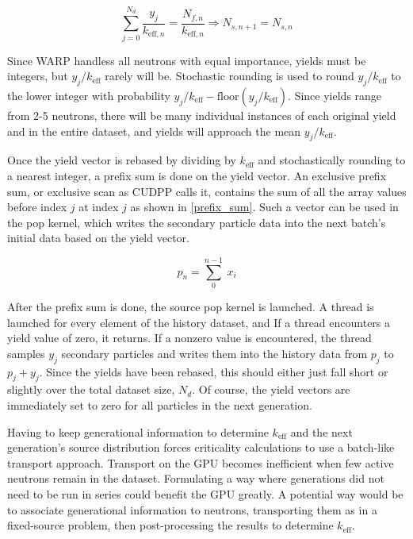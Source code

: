 \begin{equation}
\label{k_eff_rebase}
\sum_{j=0}^{N_d}  \frac{y_j }{k_{\mathrm{eff},n}} = \frac{N_{f,n}}{k_{\mathrm{eff},n}} \Rightarrow N_{s,n+1} = N_{s,n}
\end{equation}

Since WARP handless all neutrons with equal importance, yields must be integers, but $y_j/k_\mathrm{eff}$ rarely will be.  Stochastic rounding is used to round $y_j/k_\mathrm{eff}$ to the lower integer with probability $y_j/k_\mathrm{eff} - \mathrm{floor}(y_j/k_\mathrm{eff})$.  Since yields range from 2-5 neutrons, there will be many individual instances of each original yield and in the entire dataset, and yields will approach the mean $y_j/k_\mathrm{eff}$.

Once the yield vector is rebased by dividing by $k_\mathrm{eff}$ and stochastically rounding to a nearest integer, a prefix sum is done on the yield vector.  An exclusive prefix sum, or exclusive scan as CUDPP calls it, contains the sum of all the array values before index $j$ at index $j$ as shown in \eqref{prefix_sum}.  Such a vector can be used in the pop kernel, which writes the secondary particle data into the next batch's initial data based on the yield vector.

\begin{equation}
p_n = \sum_0^{n-1} \: x_i
\label{prefix_sum}
\end{equation}

After the prefix sum is done, the source pop kernel is launched.  A thread is launched for every element of the history dataset, and If a thread encounters a yield value of zero, it returns.  If a nonzero value is encountered, the thread samples $y_j$ secondary particles and writes them into the history data from $p_j$ to $p_j+y_j$.  Since the yields have been rebased, this should either just fall short or slightly over the total dataset size, $N_d$.  Of course, the yield vectors are immediately set to zero for all particles in the next generation.

Having to keep generational information to determine $k_\mathrm{eff}$ and the next generation's source distribution forces criticality calculations to use a batch-like transport approach.  Transport on the GPU becomes inefficient when few active neutrons remain in the dataset.  Formulating a way where generations did not need to be run in series could benefit the GPU greatly.  A potential way would be to associate generational information to neutrons, transporting them as in a fixed-source problem, then post-processing the results to determine $k_\mathrm{eff}$. 

